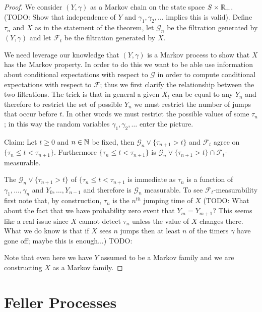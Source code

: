 \begin{proof}
We consider $(Y, \gamma)$ as a Markov chain on the state space $S
\times \mathbb{R}_+$.  (TODO: Show that independence of $Y$ and $\gamma_1,
\gamma_2, \dotsc$ implies this is valid).  Define $\tau_n$ and $X$ as
in the statement of the theorem, let $\mathcal{G}_n$ be the filtration
generated by $(Y, \gamma)$ and let $\mathcal{F}_t$ be the filtration
generated by $X$.

We need leverage our knowledge that $(Y,\gamma)$ is a Markov process
to show that $X$ has the Markov property.  In order to do this we want
to be able use information about conditional expectations with respect
to $\mathcal{G}$ in order to compute conditional expectations with
respect to $\mathcal{F}$; thus we first clarify the relationship
between the two filtrations.  The trick is that in general a given
$X_t$ can be equal to any $Y_n$ and therefore to restrict the set of
possible $Y_n$ we must restrict the number of jumps that occur before
$t$.  In other words we must restrict the possible values of some
$\tau_n$; in this way the random variables $\gamma_1, \gamma_2,
\dotsc$ enter the picture.

Claim: Let $t \geq 0$ and $n \in \mathbb{N}$ be fixed, then
$\mathcal{G}_n \vee \lbrace \tau_{n+1} > t \rbrace$ and
$\mathcal{F}_t$ agree on $\lbrace \tau_n \leq t < \tau_{n+1}\rbrace$.
Furthermore $\lbrace \tau_n \leq t < \tau_{n+1}\rbrace$ is
$\mathcal{G}_n \vee \lbrace \tau_{n+1} > t\rbrace\cap \mathcal{F}_t$-measurable.

The $\mathcal{G}_n \vee \lbrace \tau_{n+1} > t \rbrace$ of $\lbrace
\tau_n \leq t < \tau_{n+1}$ is immediate as $\tau_n$ is a function of
$\gamma_1, \dotsc, \gamma_n$ and $Y_0, \dotsc, Y_{n-1}$ and therefore is
$\mathcal{G}_n$ measurable.  To see $\mathcal{F}_t$-measurability
first note that, by construction, $\tau_n$ is the $n^{th}$ jumping
time of $X$ (TODO: What about the fact that we have probability zero
event that $Y_m = Y_{m+1}$?  This seems like a real issue since $X$
cannot detect $\tau_n$ unless the value of $X$ changes there.  What we
do know is that if $X$ sees $n$ jumps then at least $n$ of the timers
$\gamma$ have gone off; maybe this is enough...)
TODO:

Note that even here we have $Y$ assumed to be a Markov family and we
are constructing $X$ as a Markov family.
\end{proof}
\section{Feller Processes}

